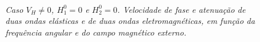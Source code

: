 \begin{figure}
\centering
{}
\\
\\
\\
\caption{\textit{Caso $V_H\neq0$, $H_1^0=0$ e $H_2^0=0$. Velocidade de fase e atenua\c{c}\~ao de duas ondas el\'asticas e de duas ondas eletromagn\'eticas, em fun\c{c}\~ao da frequ\^encia angular e do campo magn\'etico externo.}}
\label{fig.mag_horiz_ext_nula}
\end{figure}


